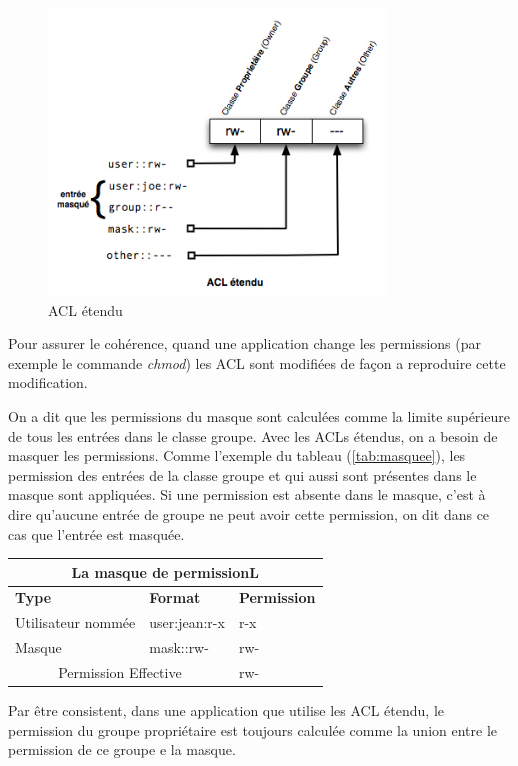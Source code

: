 \begin{figure}[htbp]
\centering
\includegraphics[height=3in]{img/acl-mapping-etendu.jpg}
\caption{ACL étendu}
\label{fig:img_acl-mapping2}
\end{figure}

 
Pour assurer le cohérence, quand une application change les permissions (par exemple le commande \emph{chmod}) les ACL sont modifiées de façon a reproduire cette modification.
 
On a dit que les permissions du masque sont calculées comme la limite supérieure de tous les entrées dans le classe groupe. Avec les ACLs étendus, on a besoin de masquer les permissions. Comme l'exemple du tableau (\ref{tab:masquee}), les permission des entrées de la classe groupe et qui aussi sont présentes dans le masque sont appliquées. Si une permission est absente dans le masque, c'est à dire qu'aucune entrée de groupe ne peut avoir cette permission, on dit dans ce cas que l'entrée est masquée.
 
\begin{center}
\begin{tabular}{|l|l|l|}
  \hline
    \multicolumn{3}{|c|}{La masque de permissionL} \\
  \hline
\textbf{Type} & \textbf{Format} & \textbf{Permission} \\
  \hline
Utilisateur nommée & user:jean:r-x & r-x\\
  \hline
Masque & mask::rw- & rw-\\
  \hline
\multicolumn{2}{|c|}{Permission Effective} & rw-\\
  \hline
\end{tabular}
\label{tab:masque}
\end{center}


Par être consistent, dans une application que utilise les ACL étendu, le permission du groupe propriétaire est toujours calculée comme la union entre le permission de ce groupe e la masque.  
 
